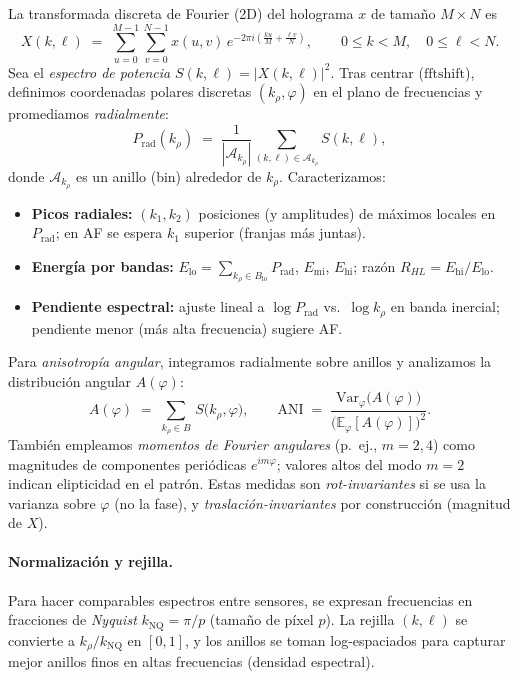 La transformada discreta de Fourier (2D) del holograma $x$ de tamaño $M\times N$ es
\begin{equation}
X(k,\ell) \;=\; \sum_{u=0}^{M-1}\sum_{v=0}^{N-1} x(u,v)\, e^{-2\pi i\left(\frac{ku}{M}+\frac{\ell v}{N}\right)},\qquad
0\le k<M,\quad 0\le \ell<N.
\end{equation}
Sea el \emph{espectro de potencia} $S(k,\ell)=|X(k,\ell)|^2$. Tras centrar ($\mathrm{fftshift}$), definimos coordenadas polares discretas $(k_\rho,\varphi)$ en el plano de frecuencias y promediamos \emph{radialmente}:
\begin{equation}
P_{\mathrm{rad}}(k_\rho) \;=\; \frac{1}{|\mathcal{A}_{k_\rho}|}\sum_{(k,\ell)\in \mathcal{A}_{k_\rho}} S(k,\ell),
\end{equation}
donde $\mathcal{A}_{k_\rho}$ es un anillo (bin) alrededor de $k_\rho$. Caracterizamos:
\begin{itemize}
\item \textbf{Picos radiales:} $(k_1,k_2)$ posiciones (y amplitudes) de máximos locales en $P_{\mathrm{rad}}$; en AF se espera $k_1$ superior (franjas más juntas).
\item \textbf{Energía por bandas:} $E_\text{lo}=\sum_{k_\rho\in B_\text{lo}}P_{\mathrm{rad}}$, $E_\text{mi}$, $E_\text{hi}$; razón $R_{HL}=E_\text{hi}/E_\text{lo}$.
\item \textbf{Pendiente espectral:} ajuste lineal a $\log P_{\mathrm{rad}}$ vs.\ $\log k_\rho$ en banda inercial; pendiente menor (más alta frecuencia) sugiere AF.
\end{itemize}

Para \emph{anisotropía angular}, integramos radialmente sobre anillos y analizamos la distribución angular $A(\varphi)$:
\begin{equation}
A(\varphi) \;=\; \sum_{k_\rho\in B}\, S\big(k_\rho,\varphi\big),\qquad 
\mathrm{ANI} \;=\; \frac{\mathrm{Var}_\varphi\!\big(A(\varphi)\big)}{\big(\mathbb{E}_\varphi[A(\varphi)]\big)^2}.
\end{equation}
También empleamos \emph{momentos de Fourier angulares} (p.~ej., $m=2,4$) como magnitudes de componentes periódicas $e^{im\varphi}$; valores altos del modo $m=2$ indican elipticidad en el patrón. Estas medidas son \emph{rot-invariantes} si se usa la varianza sobre $\varphi$ (no la fase), y \emph{traslación-invariantes} por construcción (magnitud de $X$).

\paragraph{Normalización y rejilla.} Para hacer comparables espectros entre sensores, se expresan frecuencias en fracciones de \emph{Nyquist} $k_\mathrm{NQ}=\pi/p$ (tamaño de píxel $p$). La rejilla $(k,\ell)$ se convierte a $k_\rho/k_\mathrm{NQ}$ en $[0,1]$, y los anillos se toman log-espaciados para capturar mejor anillos finos en altas frecuencias (densidad espectral).

